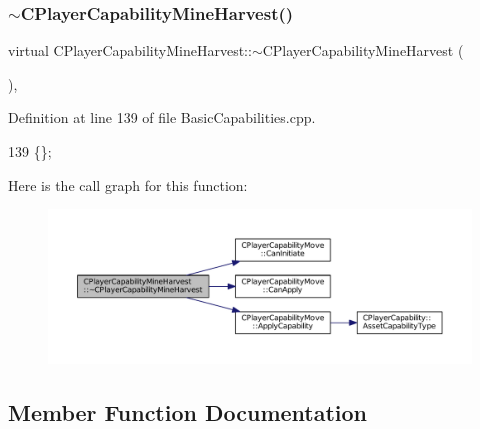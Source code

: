 \subsubsection{\texorpdfstring{$\sim$\+C\+Player\+Capability\+Mine\+Harvest()}{~CPlayerCapabilityMineHarvest()}}
{\footnotesize\ttfamily virtual C\+Player\+Capability\+Mine\+Harvest\+::$\sim$\+C\+Player\+Capability\+Mine\+Harvest (\begin{DoxyParamCaption}{ }\end{DoxyParamCaption})\hspace{0.3cm}{\ttfamily [inline]}, {\ttfamily [virtual]}}



Definition at line 139 of file Basic\+Capabilities.\+cpp.


\begin{DoxyCode}
139 \{\};
\end{DoxyCode}
Here is the call graph for this function\+:
\nopagebreak
\begin{figure}[H]
\begin{center}
\leavevmode
\includegraphics[width=350pt]{classCPlayerCapabilityMineHarvest_aae786f3ba01e3f26359a38166af77ce5_cgraph}
\end{center}
\end{figure}


\subsection{Member Function Documentation}
\hypertarget{classCPlayerCapabilityMineHarvest_a76a72fe97148f5026e67aab24ab21b21}{}\label{classCPlayerCapabilityMineHarvest_a76a72fe97148f5026e67aab24ab21b21} 

